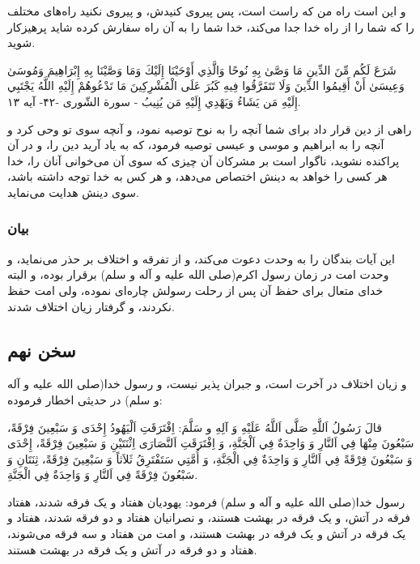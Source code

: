 و این است راه من که راست است، پس پیروی کنیدش، و پیروی نکنید راه‌های
مختلف را که شما را از راه خدا جدا می‌کند، خدا شما را به آن راه سفارش
کرده شاید پرهیزکار شوید.

شَرَعَ لَكُم مِّنَ الدِّينِ مَا وَصَّىٰ بِهِ نُوحًا وَالَّذِي أَوْحَيْنَا إِلَيْكَ وَمَا وَصَّيْنَا بِهِ إِبْرَاهِيمَ
وَمُوسَىٰ وَعِيسَىٰ أَنْ أَقِيمُوا الدِّينَ وَلَا تَتَفَرَّقُوا فِيهِ كَبُرَ عَلَى الْمُشْرِكِينَ مَا تَدْعُوهُمْ
إِلَيْهِ اللَّهُ يَجْتَبِي إِلَيْهِ مَن يَشَاءُ وَيَهْدِي إِلَيْهِ مَن يُنِيبُ - سورة الشّوری -۴۲- آیه
۱۳.

راهی از دین قرار داد برای شما آنچه را به نوح توصیه نمود، و آنچه سوی تو
وحی کرد و آنچه را به ابراهیم و موسی و عیسی توصیه فرمود، که به یاد آرید
دین را، و در آن پراکنده نشوید، ناگوار است بر مشرکان آن چیزی که سوی آن
می‌خوانی آنان را، خدا هر کسی را خواهد به دینش اختصاص می‌دهد، و هر کس به
خدا توجه داشته باشد، سوی دینش هدایت می‌نماید.

\subsubsection*{بیان}

این آیات بندگان را به وحدت دعوت می‌کند، و از تفرقه و اختلاف بر حذر
می‌نماید، و وحدت امت در زمان رسول اکرم(صلی الله علیه و آله و سلم)
برقرار بوده، و البته خدای متعال برای حفظ آن پس از رحلت رسولش چاره‌ای
نموده، ولی امت حفظ نکردند، و گرفتار زیان اختلاف شدند.

\subsection*{سخن نهم}

و زیان اختلاف در آخرت است، و جبران پذیر نیست، و رسول خدا(صلی الله علیه
و آله و سلم) در حدیثی اخطار فرموده:

قالَ رَسُولُ اَللَّهِ صَلَّى اَللَّهُ عَلَيْهِ وَ آلِهِ و سَلَّمَ: اِفْتَرَقَتِ اَلْيَهُودُ إِحْدَى وَ سَبْعِينَ
فِرْقَةً، سَبْعُونَ مِنْهَا فِي اَلنَّارِ وَ وَاحِدَةٌ فِي اَلْجَنَّةِ، وَ اِفْتَرَقَتِ اَلنَّصَارَى اِثْنَتَيْنِ وَ
سَبْعِينَ فِرْقَةً، إِحْدَى وَ سَبْعُونَ فِرْقَةً فِي اَلنَّارِ وَ وَاحِدَةٌ فِي الْجَنَّةِ، وَ أُمَّتِي سَتَفْتَرِقُ
ثَلاَثاً وَ سَبْعِينَ فِرْقَةً، ثِنَتَانِ وَ سَبْعُونَ فِرْقَةً فِي اَلنَّارِ وَ وَاحِدَةٌ فِي الْجَنَّةِ.


رسول خدا(صلی الله علیه و آله و سلم) فرمود: یهودیان هفتاد و یک فرقه
شدند، هفتاد فرقه در آتش، و یک فرقه در بهشت هستند، و نصرانیان هفتاد و
دو فرقه شدند، هفتاد و یک فرقه در آتش و یک فرقه در بهشت هستند، و امت من
هفتاد و سه فرقه می‌شوند، هفتاد و دو فرقه در آتش و یک فرقه در بهشت
هستند.

